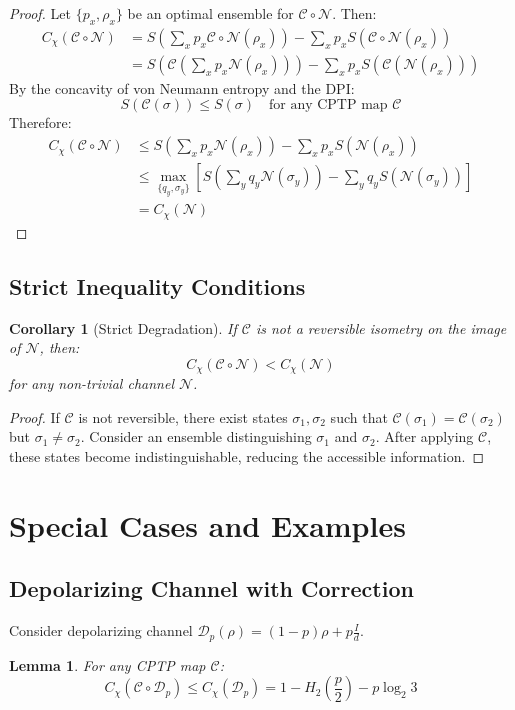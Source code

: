 \documentclass[12pt]{article}
\newtheorem{lemma}{Lemma}
\newtheorem{corollary}{Corollary}
\begin{document}
\begin{proof}
Let $\{p_x, \rho_x\}$ be an optimal ensemble for $\mathcal{C} \circ \mathcal{N}$. Then:
\begin{align*}
C_{\chi}(\mathcal{C} \circ \mathcal{N}) 
&= S\left(\sum_x p_x \mathcal{C} \circ \mathcal{N}(\rho_x)\right) - \sum_x p_x S(\mathcal{C} \circ \mathcal{N}(\rho_x)) \\
&= S\left(\mathcal{C}\left(\sum_x p_x \mathcal{N}(\rho_x)\right)\right) - \sum_x p_x S(\mathcal{C}(\mathcal{N}(\rho_x)))
\end{align*}
By the concavity of von Neumann entropy and the DPI:
\[
S(\mathcal{C}(\sigma)) \leq S(\sigma) \quad \text{for any CPTP map } \mathcal{C}
\]
Therefore:
\begin{align*}
C_{\chi}(\mathcal{C} \circ \mathcal{N}) 
&\leq S\left(\sum_x p_x \mathcal{N}(\rho_x)\right) - \sum_x p_x S(\mathcal{N}(\rho_x)) \\
&\leq \max_{\{q_y, \sigma_y\}} \left[ S\left(\sum_y q_y \mathcal{N}(\sigma_y)\right) - \sum_y q_y S(\mathcal{N}(\sigma_y)) \right] \\
&= C_{\chi}(\mathcal{N})
\end{align*}
\end{proof}

\subsection{Strict Inequality Conditions}
\begin{corollary}[Strict Degradation]
If $\mathcal{C}$ is not a reversible isometry on the image of $\mathcal{N}$, then:
\[
C_{\chi}(\mathcal{C} \circ \mathcal{N}) < C_{\chi}(\mathcal{N})
\]
for any non-trivial channel $\mathcal{N}$.
\end{corollary}

\begin{proof}
If $\mathcal{C}$ is not reversible, there exist states $\sigma_1, \sigma_2$ such that $\mathcal{C}(\sigma_1) = \mathcal{C}(\sigma_2)$ but $\sigma_1 \neq \sigma_2$. Consider an ensemble distinguishing $\sigma_1$ and $\sigma_2$. After applying $\mathcal{C}$, these states become indistinguishable, reducing the accessible information.
\end{proof}

\section{Special Cases and Examples}

\subsection{Depolarizing Channel with Correction}
Consider depolarizing channel $\mathcal{D}_p(\rho) = (1-p)\rho + p\frac{I}{d}$.
\begin{lemma}
For any CPTP map $\mathcal{C}$:
\[
C_{\chi}(\mathcal{C} \circ \mathcal{D}_p) \leq C_{\chi}(\mathcal{D}_p) = 1 - H_2\left(\frac{p}{2}\right) - p\log_2 3
\]
\end{lemma}
\end{document}
